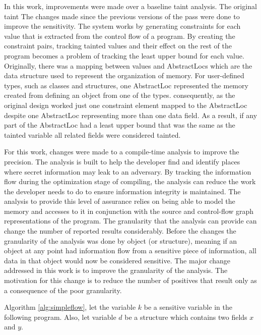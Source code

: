 \documentclass[11pt,a4paper]{article}
\begin{document}
  In this work, improvements were made over a baseline taint analysis. The
  original taint  
  The changes made since the previous versions of the pass were done to improve
  the sensitivity. The system works by generating constraints for each value that
  is extracted from the control flow of a program. By creating the constraint
  pairs, tracking tainted values and their effect on  the rest of the program
  becomes a problem of tracking the least upper bound for each value.  Originally,
  there was a mapping between values and AbstractLocs which are the data structure
  used to represent the organization of memory. For user-defined types, such as
  classes and structures, one AbstractLoc represented the memory created from
  defining an object from one of the types. consequently, as the original design
  worked just one constraint element mapped to the AbstractLoc despite one
  AbstractLoc representing more than one data field. As a result, if any part of
  the AbstractLoc had a least upper bound that was the same as the tainted
  variable all related fields were considered tainted.

  For this work, changes were made to a compile-time analysis to improve
  the precision. The analysis is built to help the developer find and identify
  places where secret information may leak to an adversary. By tracking the
  information flow during the optimization stage of compiling, the analysis can
  reduce the work the developer needs to do to ensure information integrity is
  maintained. The analysis to provide this level of assurance relies on being
  able to model the memory and accesses to it in conjunction with the source
  and control-flow graph representations of the program. The granularity
  that the analysis can provide can change the number of reported results
  considerably. Before the changes the granularity of the analysis was done
  by object (or structure), meaning if an object at any point had information
  flow from a sensitive piece of information, all data in that object would
  now be considered sensitive. The major change addressed in this work is to
  improve the granularity of the analysis. The motivation for this change is
  to reduce the number of positives that result only as a consequence of the
  poor granularity.


  Algorithm \ref{alg:simpleflow}, let the variable $k$ be a sensitive variable in the following program. Also, let
  variable $d$ be a structure which contains two fields $x$ and $y$. 

  \begin{algorithm}

  \end{algorithm}
\end{document}
